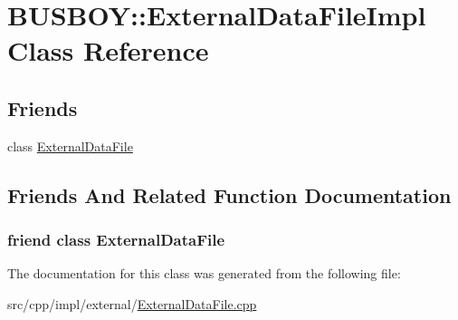 \hypertarget{classBUSBOY_1_1ExternalDataFileImpl}{
\section{BUSBOY::ExternalDataFileImpl Class Reference}
\label{classBUSBOY_1_1ExternalDataFileImpl}
}
\subsection*{Friends}
\begin{DoxyCompactItemize}
\item 
class \hyperlink{classBUSBOY_1_1ExternalDataFileImpl_a164eb0ea456fb4ec4b82871bd13c11db}{ExternalDataFile}
\end{DoxyCompactItemize}


\subsection{Friends And Related Function Documentation}
\hypertarget{classBUSBOY_1_1ExternalDataFileImpl_a164eb0ea456fb4ec4b82871bd13c11db}{
\subsubsection[{ExternalDataFile}]{\setlength{\rightskip}{0pt plus 5cm}friend class {\bf ExternalDataFile}}}
\label{classBUSBOY_1_1ExternalDataFileImpl_a164eb0ea456fb4ec4b82871bd13c11db}


The documentation for this class was generated from the following file:\begin{DoxyCompactItemize}
\item 
src/cpp/impl/external/\hyperlink{ExternalDataFile_8cpp}{ExternalDataFile.cpp}\end{DoxyCompactItemize}
